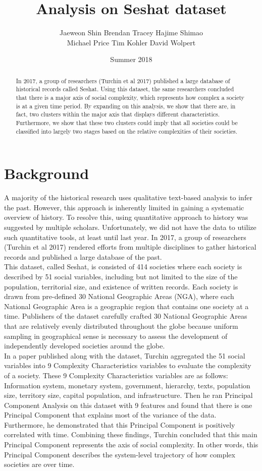 \documentclass[11pt]{article}
\title{
	Analysis on Seshat dataset \\
	\bigskip
	}
\author{Jaeweon Shin \space Brendan Tracey \space Hajime Shimao \\ Michael Price \space Tim Kohler \space David Wolpert}
\date{Summer 2018}
\begin{document}
	\maketitle
	
	\begin{abstract}
		In 2017, a group of researchers (Turchin et al 2017) published a large database of historical records called Seshat. Using this dataset, the same researchers concluded that there is a major axis of social complexity, which  represents how complex a society is at a given time period. By expanding on this analysis, we show that there are, in fact, two clusters within the major axis that displays different characteristics. Furthermore, we show that these two clusters could imply that all societies could be classified into largely two stages based on the relative complexities of their societies. 
	\end{abstract}
	
\section{Background}
A majority of the historical research uses qualitative text-based analysis to infer the past. However, this approach is inherently limited in gaining a systematic overview of history. To resolve this, using quantitative approach to history was suggested by multiple scholars. Unfortunately, we did not have the data to utilize such quantitative tools, at least until last year. In 2017, a group of researchers (Turchin et al 2017) rendered efforts from multiple disciplines to gather historical records and published a large database of the past. \\
This dataset, called Seshat, is consisted of 414 societies where each society is described by 51 social variables, including but not limited to the size of the population, territorial size, and existence of written records. Each society is drawn from pre-defined 30 National Geographic Areas (NGA), where each National Geographic Area is a geographic region that contains one society at a time. Publishers of the dataset carefully crafted 30 National Geographic Areas that are relatively evenly distributed throughout the globe because uniform sampling in geographical sense is necessary to assess the development of independently developed societies around the globe. \\
In a paper published along with the dataset, Turchin aggregated the 51 social variables into 9 Complexity Characteristics variables to evaluate the complexity of a society. These 9 Complexity Characteristics variables are as follows: Information system, monetary system, government, hierarchy, texts, population size, territory size, capital population, and infrastructure. Then he ran Principal Component Analysis on this dataset with 9 features and found that there is one Principal Component that explains most of the variance of the data. Furthermore, he demonstrated that this Principal Component is positively correlated with time. Combining these findings, Turchin concluded that this main Principal Component represents the axis of social complexity. In other words, this Principal Component describes the system-level trajectory of how complex societies are over time. 
\end{document}
